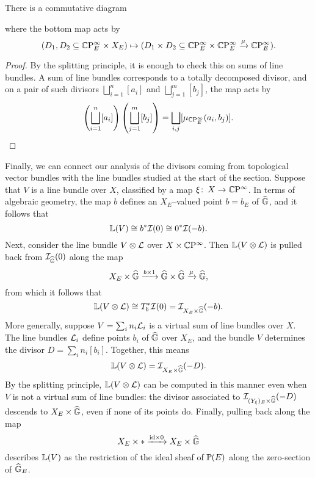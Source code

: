\begin{corollary}
There is a commutative diagram
\begin{center}
\end{center}
where the bottom map acts by \[(D_1, D_2 \subseteq \CP^\infty_E \times X_E) \mapsto (D_1 \times D_2 \subseteq \CP^\infty_E \times \CP^\infty_E \xrightarrow{\mu} \CP^\infty_E).\]
\end{corollary}
\begin{proof}
By the splitting principle, it is enough to check this on sums of line bundles.  A sum of line bundles corresponds to a totally decomposed divisor, and on a pair of such divisors $\bigsqcup_{i=1}^n [a_i]$ and $\bigsqcup_{j=1}^m [b_j]$, the map acts by \[\left(\bigsqcup_{i=1}^n [a_i] \right) \left( \bigsqcup_{j=1}^m [b_j] \right) = \bigsqcup_{i, j} [\mu_{\CP^\infty_E}(a_i, b_j)]. \qedhere\]
\end{proof}

Finally, we can connect our analysis of the divisors coming from topological vector bundles with the line bundles studied at the start of the section.  Suppose that $V$ is a line bundle over $X$, classified by a map $\xi \co X \to \CP^\infty$.  In terms of algebraic geometry, the map $b$ defines an $X_E$--valued point $b = b_E$ of $\G$, and it follows that \[\ThomSheaf{V} \cong b^* \sheaf I(0) \cong 0^* \sheaf I(-b).\]  Next, consider the line bundle $V \otimes \L$ over $X \times \CP^\infty$.  Then $\ThomSheaf{V \otimes \L}$ is pulled back from $\sheaf I_{\G} (0)$ along the map \[X_E \times \G \xrightarrow{b \times 1} \G \times \G \xrightarrow{\mu} \G,\] from which it follows that \[\ThomSheaf{V \otimes \L} \cong T_b^* \sheaf I(0) = \sheaf I_{X_E \times \G}(-b).\]  More generally, suppose $V = \sum_i n_i \L_i$ is a virtual sum of line bundles over $X$.  The line bundles $\L_i$ define points $b_i$ of $\G$ over $X_E$, and the bundle $V$ determines the divisor $D = \sum_i n_i [b_i]$.  Together, this means \[\ThomSheaf{V \otimes \L} = \sheaf I_{X_E \times \G}(-D).\]  By the splitting principle, $\ThomSheaf{V \otimes \L}$ can be computed in this manner even when $V$ is not a virtual sum of line bundles: the divisor associated to $\sheaf I_{(Y_\xi)_E \times \G}(-D)$ descends to $X_E \times \G$, even if none of its points do.  Finally, pulling back along the map \[X_E \times * \xrightarrow{\id \times 0} X_E \times \G\] describes $\ThomSheaf{V}$ as the restriction of the ideal sheaf of $\P(E)$ along the zero-section of $\G_E$.


